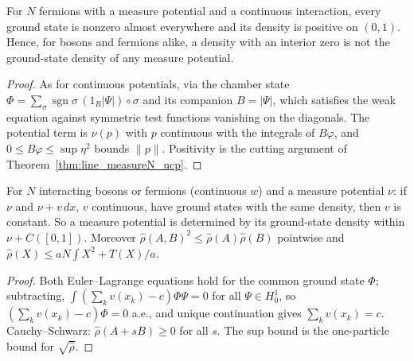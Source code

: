 \begin{theorem}
  \label{thm:line_measureN_fer}
  \leanok
  For $N$ fermions with a measure potential and a continuous interaction, every ground state is nonzero almost everywhere
  and its density is positive on $(0,1)$. Hence, for bosons and fermions alike, a density with an interior zero is not the
  ground-state density of any measure potential.
\end{theorem}
\begin{proof}
  \leanok
  As for continuous potentials, via the chamber state $\Phi=\sum_\sigma\operatorname{sgn}\sigma\,(1_R|\Psi|)\circ\sigma$ and its
  companion $B=|\Psi|$, which satisfies the weak equation against symmetric test functions vanishing on the diagonals. The
  potential term is $\nu(p)$ with $p$ continuous with the integrals of $B\varphi$, and $0\le B\varphi\le\sup\eta^2$ bounds
  $\|p\|$. Positivity is the cutting argument of Theorem~\ref{thm:line_measureN_ucp}.
\end{proof}

\begin{theorem}
  \label{thm:line_measureN_hkc}
  \leanok
  For $N$ interacting bosons or fermions (continuous $w$) and a measure potential $\nu$: if $\nu$ and $\nu+v\,dx$, $v$ continuous,
  have ground states with the same density, then $v$ is constant. So a measure potential is determined by its ground-state
  density within $\nu+C([0,1])$. Moreover $\hat\rho(A,B)^2\le\hat\rho(A)\hat\rho(B)$ pointwise and
  $\hat\rho(X)\le aN\int X^2+T(X)/a$.
\end{theorem}
\begin{proof}
  \leanok
  Both Euler--Lagrange equations hold for the common ground state $\Phi$; subtracting, $\int(\sum_kv(x_k)-c)\Phi\Psi=0$ for all
  $\Psi\in H^1_0$, so $(\sum_kv(x_k)-c)\Phi=0$ a.e., and unique continuation gives $\sum_kv(x_k)=c$. Cauchy--Schwarz: $\hat\rho(A+sB)\ge0$
  for all $s$. The sup bound is the one-particle bound for $\sqrt{\hat\rho}$.
\end{proof}

